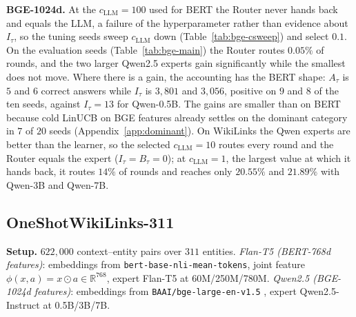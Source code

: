 \documentclass[anon]{alt2027} %
\begin{document}
\textbf{BGE-1024d.} At the $c_{\mathrm{LLM}}=100$ used for BERT the Router never hands
back and equals the LLM, a failure of the hyperparameter rather than evidence
about $I_\tau$, so the tuning seeds sweep $c_{\mathrm{LLM}}$ down
(Table~\ref{tab:bge-csweep}) and select $0.1$. On the evaluation seeds
(Table~\ref{tab:bge-main}) the Router routes $0.05\%$ of rounds, and the two
larger Qwen2.5 experts gain significantly while the smallest does not move.
Where there is a gain, the accounting has the BERT shape: $A_\tau$ is $5$ and
$6$ correct answers while $I_\tau$ is $3{,}801$ and $3{,}056$, positive on $9$
and $8$ of the ten seeds, against $I_\tau=13$ for Qwen-0.5B. The gains are
smaller than on BERT because cold LinUCB on BGE features already settles on
the dominant category in $7$ of $20$ seeds (Appendix~\ref{app:dominant}). On
WikiLinks the Qwen experts are better than the learner, so the selected
$c_{\mathrm{LLM}}=10$ routes every round and the Router equals the expert
($I_\tau=B_\tau=0$); at $c_{\mathrm{LLM}}=1$, the largest value at which it hands
back, it routes $14\%$ of rounds and reaches only $20.55\%$ and $21.89\%$ with
Qwen-3B and Qwen-7B.

\subsection{OneShotWikiLinks-311}
\label{app:wiki}

\textbf{Setup.} $622{,}000$ context--entity pairs over $311$ entities.
\emph{Flan-T5 (BERT-768d features)}: embeddings from
\texttt{bert-base-nli-mean-tokens}, joint feature $\phi(x,a)=x\odot a\in\mathbb R^{768}$,
expert Flan-T5 \citep{chung2024scaling} at 60M/250M/780M.
\emph{Qwen2.5 (BGE-1024d features)}: embeddings from
\texttt{BAAI/bge-large-en-v1.5} \citep{xiao2024c}, expert Qwen2.5-Instruct
\citep{hui2024qwen2} at 0.5B/3B/7B.
\end{document}
